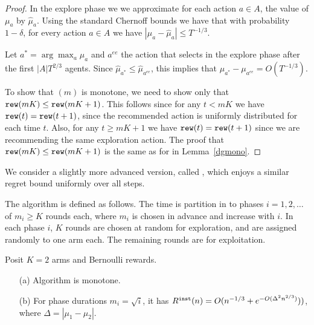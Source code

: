 \begin{proof}
In the explore phase we we approximate for each action $a\in A$, the
value of $\mu_a$ by $\hat{\mu}_a$. Using the standard Chernoff
bounds we have that with probability $1-\delta$, for every action
$a\in A$ we have $|\mu_a -\hat{\mu}_a| \leq T^{-1/3}$.

Let $a^* = \arg\max_a \mu_a$ and $a^{ee}$ the action that
\ExplorExploit selects in the explore phase after the first
$|A|T^{2/3}$ agents. Since $\hat{\mu}_{a^*} \leq
\hat{\mu}_{a^{ee}}$, this implies that $\mu_{a^*} -
\mu_{a^{ee}}=O(T^{-1/3})$.

To show that \ExplorExploit$(m)$ is monotone, we need to show only
that $\mathtt{rew}(mK) \leq \mathtt{rew}(mK+1)$. This follows since for any $t< mK$
we have $\mathtt{rew}(t)=\mathtt{rew}(t+1)$, since the recommended action is
uniformly distributed for each time $t$. Also, for any $t\geq mK+1$
we have $\mathtt{rew}(t)=\mathtt{rew}(t+1)$ since we are recommending the same
exploration action. The proof that $\mathtt{rew}(mK) \leq \mathtt{rew}(mK+1)$ is the
same as for \DynGreedy in Lemma~\ref{dgmono}.
\end{proof}

We consider a slightly more advanced version, called \PhasedExplorExploit, which enjoys a similar regret bound uniformly over all steps.

The algorithm is defined as follows. The time is partition in to phases $i = 1,2, \ldots $ of $m_i\geq K$ rounds each, where $m_i$ is chosen in advance and increase with $i$. In each phase $i$, $K$ rounds are chosen at random for exploration, and are assigned randomly to one arm each. The remaining rounds are for exploitation. 

\begin{lemma}
Posit $K=2$ arms and Bernoulli rewards.
\begin{itemize}
\item[(a)] Algorithm \PhasedExplorExploit is monotone.

\item[(b)] For phase durations $m_i =\sqrt{i}$, it has
    $R^{\mathtt{inst}}(n)=O(n^{-1/3}+e^{-O(\Delta^2 n^{2/3})}))$,
where $\Delta = |\mu_1-\mu_2|$.
\end{itemize}
\end{lemma}

